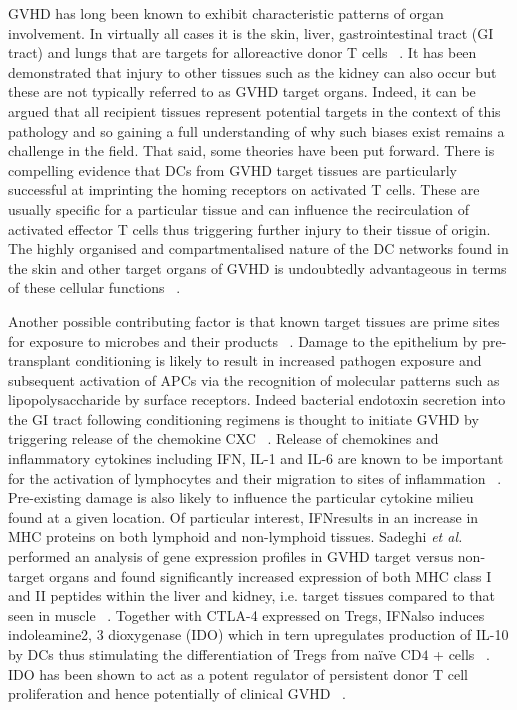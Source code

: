 GVHD has long been known to exhibit characteristic patterns of organ involvement. In virtually all cases it is the skin, liver, gastrointestinal tract (GI tract) and lungs that are targets for alloreactive donor T cells ~\autocite{Cha2007, Sad2013}. It has been demonstrated that injury to other tissues such as the kidney can also occur but these are not typically referred to as GVHD target organs. Indeed, it can be argued that all recipient tissues represent potential targets in the context of this pathology and so gaining a full understanding of why such biases exist remains a challenge in the field. That said, some theories have been put forward. There is compelling evidence that DCs from GVHD target tissues are particularly successful at imprinting the homing receptors on activated T cells. These are usually specific for a particular tissue and can influence the recirculation of activated effector T cells thus triggering further injury to their tissue of origin. The highly organised and compartmentalised nature of the DC networks found in the skin and other target organs of GVHD is undoubtedly advantageous in terms of these cellular functions ~\autocite{Cha2007}.

Another possible contributing factor is that known target tissues are prime sites for exposure to microbes and their products ~\autocite{Cha2007}. Damage to the epithelium by pre-transplant conditioning is likely to result in increased pathogen exposure and subsequent activation of APCs via the recognition of molecular patterns such as lipopolysaccharide by surface receptors. Indeed bacterial endotoxin secretion into the GI tract following conditioning regimens is thought to initiate GVHD by triggering release of the chemokine CXC ~\autocite{Sad2013}. Release of chemokines and inflammatory cytokines including IFN\textgamma, IL-1 and IL-6 are known to be important for the activation of lymphocytes and their migration to sites of inflammation ~\autocite{Map2006,Sad2013}. Pre-existing damage is also likely to influence the particular cytokine milieu found at a given location. Of particular interest, IFN\textgamma results in an increase in MHC proteins on both lymphoid and non-lymphoid tissues. Sadeghi \textit{et al.} performed an analysis of gene expression profiles in GVHD target versus non-target organs and found significantly increased expression of both MHC class I and II peptides within the liver and kidney, i.e. target tissues compared to that seen in muscle ~\autocite{Sad2013}. Together with CTLA-4 expressed on Tregs, IFN\textgamma also induces indoleamine2, 3 dioxygenase (IDO) which in tern upregulates production of IL-10 by DCs thus stimulating the differentiation of Tregs from na\"ive CD$4$ + cells ~\autocite{Tin2013}. IDO has been shown to act as a potent regulator of persistent donor T cell proliferation and hence potentially of clinical GVHD ~\autocite{Jas2008}.

